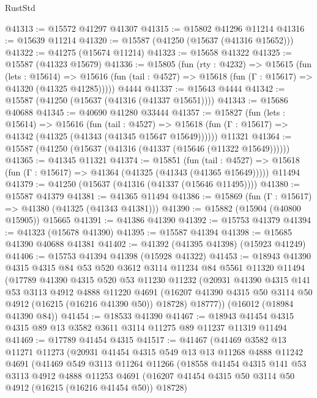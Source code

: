 \begin{lexlean}{RustStd}
\begin{coremodule}
@41313 := @15572 @41297 @41307
@41315 := @15802 @41296 @11214
@41316 := @15639 @11214
@41320 := @15587 (@41250 (@15637 (@41316 @15652)))
@41322 := @41275 (@15674 @11214)
@41323 := @15658 @41322
@41325 := @15587 (@41323 @15679)
@41336 := @15805
    (fun (rty : @4232) =>
    @15615
      (fun (lets : @15614) =>
      @15616 (fun (tail : @4527) => @15618 (fun (Γ : @15617) => @41320 (@41325 @41285)))))
    @4444
@41337 := @15643 @4444
@41342 := @15587 (@41250 (@15637 (@41316 (@41337 @15651))))
@41343 := @15686 @40688
@41345 := @40690 @41280 @33444
@41357 := @15827
    (fun (lets : @15614) =>
    @15616
      (fun (tail : @4527) =>
      @15618 (fun (Γ : @15617) => @41342 (@41325 (@41343 (@41345 @15647 @15649))))))
    @11321
@41364 := @15587 (@41250 (@15637 (@41316 (@41337 (@15646 (@11322 @15649))))))
@41365 := @41345 @11321
@41374 := @15851
    (fun (tail : @4527) => @15618 (fun (Γ : @15617) => @41364 (@41325 (@41343 (@41365 @15649)))))
    @11494
@41379 := @41250 (@15637 (@41316 (@41337 (@15646 @11495))))
@41380 := @15587 @41379
@41381 := @41365 @11494
@41386 := @15869 (fun (Γ : @15617) => @41380 (@41325 (@41343 @41381)))
@41390 := @15882 (@15904 (@40800 @15905)) @15665
@41391 := @41386 @41390
@41392 := @15753 @41379
@41394 := @41323 (@15678 @41390)
@41395 := @15587 @41394
@41398 := @15685 @41390 @40688 @41381
@41402 := @41392 (@41395 @41398) (@15923 @41249)
@41406 := @15753 @41394 @41398 (@15928 @41322)
@41453 := @18943
    @41390
    @4315
    @4315
    @84
    @53
    @520
    @3612
    @3114
    @11234
    @84
    @5561
    @11320
    @11494
    (@17789
      @41390
      @4315
      @520
      @53
      @11230
      @11232
      (@20931
        @41390
        @4315
        @141
        @53
        @3113
        @4912
        @4888
        @11220
        @4691
        (@16207 @41390 @4315 @50 @3114 @50 @4912 (@16215 (@16216 @41390 @50)) @18728)
        @18777))
    (@16012 (@18984 @41390 @84))
@41454 := @18533 @41390
@41467 := @18943 @41454 @4315 @4315 @89 @13 @3582 @3611 @3114 @11275 @89 @11237 @11319 @11494
@41469 := @17789 @41454 @4315
@41517 := @41467
    (@41469
      @3582
      @13
      @11271
      @11273
      (@20931
        @41454
        @4315
        @549
        @13
        @13
        @11268
        @4888
        @11242
        @4691
        (@41469
          @549
          @3113
          @11264
          @11266
          (@18558
            @41454
            @4315
            @141
            @53
            @3113
            @4912
            @4888
            @11253
            @4691
            (@16207 @41454 @4315 @50 @3114 @50 @4912 (@16215 (@16216 @41454 @50)) @18728)

\end{coremodule}
\end{lexlean}
